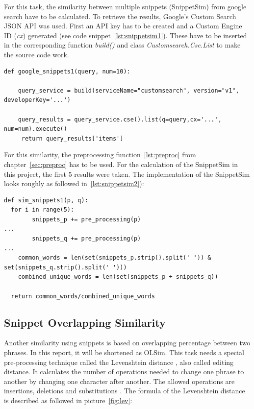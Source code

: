 \documentclass[conference]{IEEEtran}
\begin{document}
For this task, the similarity between multiple snippets (SnippetSim)  from google search have to be calculated. To retrieve the results, Google's Custom Search JSON API was used. First an API key has to be created and a Custom Engine ID (\textit{cx}) generated (see code snippet~\ref{lst:snippetsim1}). These have to be inserted in the corresponding function \textit{build()} and class \textit{Customsearch.Cse.List} to make the source code work.

\begin{lstlisting}[frame=single, label=lst:snippetsim1, caption={Connection to Google Search API}, captionpos=b]
def google_snippets1(query, num=10):

    query_service = build(serviceName="customsearch", version="v1", developerKey='...')

    query_results = query_service.cse().list(q=query,cx='...', num=num).execute()
     return query_results['items']
\end{lstlisting}

For this similarity, the preprocessing function~\ref{lst:preproc} from chapter~\ref{sec:preproc} has to be used. For the calculation of the SnippetSim in this project, the first 5 results were taken. The implementation of the SnippetSim looks roughly as followed in~\ref{lst:snippetsim2}):

\begin{lstlisting}[frame=single, label=lst:snippetsim2, caption={Calculation of SnippetSim}, captionpos=b]
def sim_snippets1(p, q):
  for i in range(5):
        snippets_p += pre_processing(p)    
... 
        snippets_q += pre_processing(p)
...    
    common_words = len(set(snippets_p.strip().split(' ')) & set(snippets_q.strip().split(' '))) 
    combined_unique_words = len(set(snippets_p + snippets_q))
    
  return common_words/combined_unique_words
\end{lstlisting}

\subsection{Snippet Overlapping Similarity}\label{subsec:olsim}

Another similarity using snippets is based on overlapping percentage between two phrases. In this report, it will be shortened as OLSim. This task needs a special pre-processing technique called the Levenshtein distance \cite{levenshtein}, also called editing distance. It calculates the number of operations needed to change one phrase to another by changing one character after another. The allowed operations are insertions, deletions and substitutions \cite{navarro}. The formula of the Levenshtein distance is described as followed in picture~\ref{fig:lev}:
\end{document}
